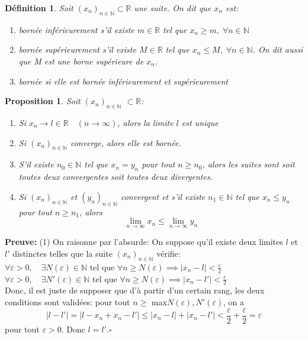 \documentclass[a4paper, 12pt, french, twoside]{article}
\newtheorem{proposition}[theorem]{Proposition}
\newtheorem{defi}[theorem]{Définition}
\newcommand{\Nn}{{\mathbb{N}}}
\newcommand{\Rr}{{\mathbb{R}}}
\begin{document}
\begin{defi}
    Soit $(x_n)_{n\in\Nn}\subset \Rr$ une suite. On dit que $x_n$ est:
    \begin{enumerate}
        \item bornée inférieurement s'il existe $m\in \Rr$ tel que $x_n\geq m,\; \forall n\in\Nn$
        \item bornée supérieurement s'il existe $M\in\Rr$ tel que $x_n\leq M,\; \forall n \in\Nn$. On dit aussi que M est une borne supérieure de $x_n$.
        \item bornée si elle est bornée inférieurement et supérieurement
    \end{enumerate}
\end{defi}
\begin{proposition}Soit $(x_n)_{n\in\Nn}$ $\subset \Rr$:
\begin{enumerate}
  \item Si $x_n\longrightarrow l\in \Rr \quad(n\rightarrow\infty)$, alors la limite $l$ est unique
  \item Si $(x_n)_{n\in\Nn}$ converge, alors elle est bornée.
  \item S'il existe $n_0\in\Nn$ tel que $x_n=y_n$ pour tout $n\geq n_0$, alors les suites sont soit toutes deux convergentes soit toutes deux divergentes.
  \item Si $(x_n)_{n\in\Nn}$ et $(y_n)_{n\in\Nn}$ convergent et s'il existe $n_1\in \Nn$ tel que $x_n\leq y_n$ pour tout $n\geq n_1$, alors \[\lim_{n\rightarrow\infty}x_n\leq\lim_{n\rightarrow\infty}y_n\]
\end{enumerate}
\end{proposition}
\textbf{Preuve:}
(1) On raisonne par l'absurde:
On suppose qu'il existe deux limites $l$ et $l'$ distinctes telles que la suite $(x_n)_{n\in\Nn}$ vérifie: 
\\$\forall \varepsilon>0 ,\quad \exists N(\varepsilon)\in\Nn$ tel que $ \forall n \geq N(\varepsilon) \implies |x_n-l|<\frac{\varepsilon}{2}$
\\$\forall \varepsilon>0 ,\quad \exists N'(\varepsilon)\in\Nn$ tel que $ \forall n \geq N(\varepsilon) \implies |x_n-l'|<\frac{\varepsilon}{2}$
\\Donc, il est juste de supposer que d'à partir d'un certain rang, les deux conditions sont validées: pour tout $n\geq$ max{$N(\varepsilon), N'(\varepsilon)$}, on a
\begin{equation*}
    |l-l'|=|l-x_n+x_n-l'|\leq |x_n-l|+|x_n-l'|<\frac{\varepsilon}{2}+\frac{\varepsilon}{2}=\varepsilon
\end{equation*}
pour tout $\varepsilon>0$.
Donc $l=l'$.$ \square$
\hline
\hline
\newpage
\end{document}
